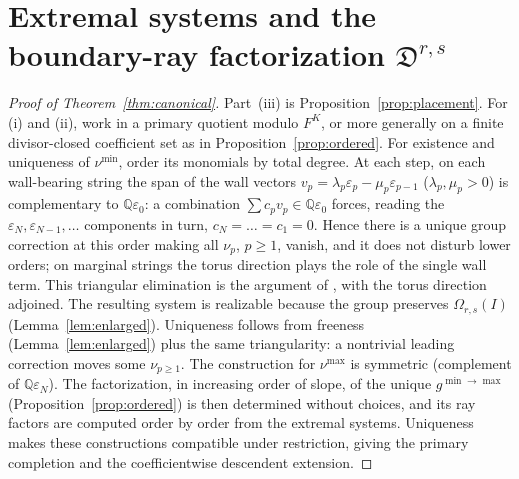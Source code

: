 \documentclass[11pt]{amsart}
\theoremstyle{definition}
\theoremstyle{remark}
\newcommand{\QQ}{\mathbb{Q}}
\newcommand{\Dscr}{\mathfrak{D}}
\newcommand{\Om}{\Omega_{r,s}}
\begin{document}
\section{Extremal systems and the boundary-ray factorization
\texorpdfstring{$\Dscr^{r,s}$}{D(r,s)}}
\label{sec:canonical}

\begin{proof}[Proof of Theorem~\ref{thm:canonical}]
Part~(iii) is Proposition~\ref{prop:placement}.  For (i) and (ii), work in a primary quotient modulo $F^K$, or more generally on a finite
divisor-closed coefficient set as in Proposition~\ref{prop:ordered}.
For existence and uniqueness of $\nu^{\min}$, order its monomials by total
degree. At each step, on each wall-bearing string the span of the wall
vectors $v_{p}=\lambda_{p}\varepsilon_{p}-\mu_{p}\varepsilon_{p-1}$ ($\lambda_{p},\mu_{p}>0$) is complementary to
$\QQ\varepsilon_{0}$: a combination $\sum c_{p}v_{p}\in\QQ\varepsilon_{0}$ forces, reading the
$\varepsilon_{N},\varepsilon_{N-1},\dots$ components in turn, $c_{N}=\dots=c_{1}=0$. Hence there is a
unique group correction at this order making all $\nu_{p}$, $p\ge1$, vanish, and
it does not disturb lower orders; on marginal strings the torus direction plays
the role of the single wall term.  This triangular elimination is the argument of
\cite[proof of Thm.~4.27, Step~3]{GKT}, with the torus direction adjoined. The resulting system is realizable because the group
preserves $\Om(I)$ (Lemma~\ref{lem:enlarged}). Uniqueness follows from
freeness (Lemma~\ref{lem:enlarged}) plus the same triangularity: a nontrivial leading correction moves some
$\nu_{p\ge1}$. The construction for $\nu^{\max}$ is symmetric (complement of
$\QQ\varepsilon_{N}$). The factorization, in increasing order of slope, of the unique
$g^{\min\to\max}$ (Proposition~\ref{prop:ordered}) is then determined
without choices, and its ray factors are computed order by order from the
extremal systems. Uniqueness
makes these constructions compatible under restriction, giving the primary
completion and the coefficientwise descendent extension.
\end{proof}
\end{document}

